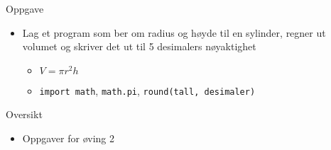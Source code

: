 \documentclass[screen, aspectratio=169]{beamer}
\begin{document}
\begin{frame}[fragile]{Oppgave}
	\begin{itemize}
		\item Lag et program som ber om radius og høyde til en sylinder, regner ut volumet og skriver det ut til 5 desimalers nøyaktighet
		\begin{itemize}
			\item $V=\pi r^2 h$
			\item \lstinline|import math|, \lstinline|math.pi|, \lstinline|round(tall, desimaler)|
		\end{itemize}
	\end{itemize}
\end{frame}

\begin{frame}{Oversikt}
	\begin{itemize}
			\item Oppgaver for øving 2
	\end{itemize}
\end{frame}
\end{document}
